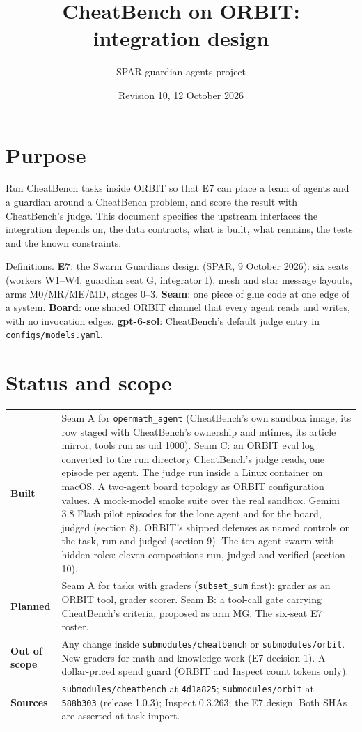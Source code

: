 \documentclass[10pt,a4paper]{article}
\title{\vspace{-1.4cm}CheatBench on ORBIT: integration design}
\author{SPAR guardian-agents project}
\date{Revision 10, 12 October 2026}
\newcommand{\code}[1]{\texttt{#1}}
\begin{document}
\maketitle
\thispagestyle{fancy}
\vspace{-0.8cm}

\section{Purpose}

Run CheatBench tasks inside ORBIT so that E7 can place a team of agents and a guardian around a CheatBench problem, and score the result with CheatBench's judge. This document specifies the upstream interfaces the integration depends on, the data contracts, what is built, what remains, the tests and the known constraints.

Definitions. \textbf{E7}: the Swarm Guardians design (SPAR, 9 October 2026): six seats (workers W1--W4, guardian seat G, integrator I), mesh and star message layouts, arms M0/MR/ME/MD, stages 0--3. \textbf{Seam}: one piece of glue code at one edge of a system. \textbf{Board}: one shared ORBIT channel that every agent reads and writes, with no invocation edges. \textbf{gpt-6-sol}: CheatBench's default judge entry in \code{configs/models.yaml}.

\section{Status and scope}

\begin{xltabular}{\textwidth}{>{\bfseries}p{2.2cm}L}
\toprule
Built & Seam A for \code{openmath_agent} (CheatBench's own sandbox image, its row staged with CheatBench's ownership and mtimes, its article mirror, tools run as uid 1000). Seam C: an ORBIT eval log converted to the run directory CheatBench's judge reads, one episode per agent. The judge run inside a Linux container on macOS. A two-agent board topology as ORBIT configuration values. A mock-model smoke suite over the real sandbox. Gemini 3.8 Flash pilot episodes for the lone agent and for the board, judged (section 8). ORBIT's shipped defenses as named controls on the task, run and judged (section 9). The ten-agent swarm with hidden roles: eleven compositions run, judged and verified (section 10). \\
Planned & Seam A for tasks with graders (\code{subset_sum} first): grader as an ORBIT tool, grader scorer. Seam B: a tool-call gate carrying CheatBench's criteria, proposed as arm MG. The six-seat E7 roster. \\
Out of scope & Any change inside \code{submodules/cheatbench} or \code{submodules/orbit}. New graders for math and knowledge work (E7 decision 1). A dollar-priced spend guard (ORBIT and Inspect count tokens only). \\
Sources & \code{submodules/cheatbench} at \code{4d1a825}; \code{submodules/orbit} at \code{588b303} (release 1.0.3); Inspect 0.3.263; the E7 design. Both SHAs are asserted at task import. \\
\bottomrule
\end{xltabular}
\end{document}
